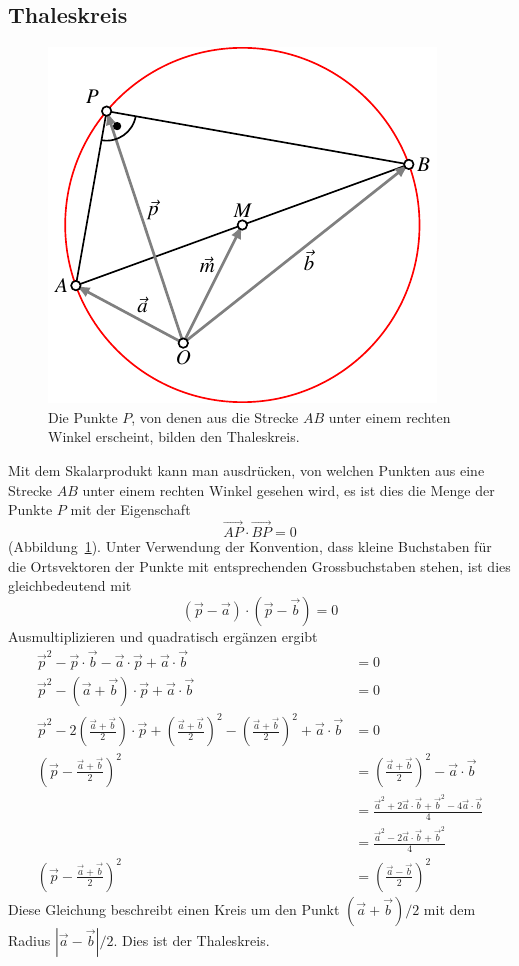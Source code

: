 %
%
\subsection{Thaleskreis}
\begin{figure}
\centering
\includegraphics{4/images/thales.pdf}
\caption{Die Punkte $P$, von denen aus die Strecke $AB$ unter einem
rechten Winkel erscheint, bilden den Thaleskreis.
\label{thales-graphik}}
\end{figure}
Mit dem Skalarprodukt kann man ausdrücken, von welchen Punkten aus
eine Strecke $AB$ unter einem rechten Winkel gesehen wird, es ist
dies die Menge der Punkte $P$ mit der Eigenschaft
\[
\overrightarrow{AP}\cdot\overrightarrow{BP}=0
\]
(Abbildung~\ref{thales-graphik}).
Unter Verwendung der Konvention, dass kleine Buchstaben für die
Ortsvektoren der Punkte mit entsprechenden Grossbuchstaben stehen, ist
dies gleichbedeutend mit
\[
(\vec p-\vec a)\cdot(\vec p-\vec b)=0
\]
Ausmultiplizieren und quadratisch ergänzen ergibt
\begin{align*}
\vec p^2-\vec p\cdot\vec b-\vec a\cdot\vec p+\vec a\cdot\vec b&=0
\\
\vec p^2-(\vec a+\vec b)\cdot \vec p+\vec a\cdot\vec b&=0
\\
\vec p^2-2\left(\frac{\vec a+\vec b}{2}\right)\cdot \vec p
+\left(\frac{\vec a+\vec b}{2}\right)^2
-\left(\frac{\vec a+\vec b}{2}\right)^2
+\vec a\cdot\vec b&=0
\\
\left(\vec p
-\frac{\vec a+\vec b}{2}\right)^2&=
\left(\frac{\vec a+\vec b}{2}\right)^2-\vec a\cdot \vec b
\\
&=
\frac{\vec a^2+2\vec a\cdot\vec b+\vec b^2-4\vec a\cdot \vec b}{4}
\\
&=
\frac{\vec a^2-2\vec a\cdot\vec b+\vec b^2}{4}
\\
\left(\vec p
-\frac{\vec a+\vec b}{2}\right)^2&=
\left(\frac{\vec a-\vec b}{2}\right)^2
\end{align*}
Diese Gleichung beschreibt einen Kreis um den Punkt $(\vec a+\vec b)/2$
mit dem Radius $|\vec a-\vec b|/2$.
Dies ist der Thaleskreis.

